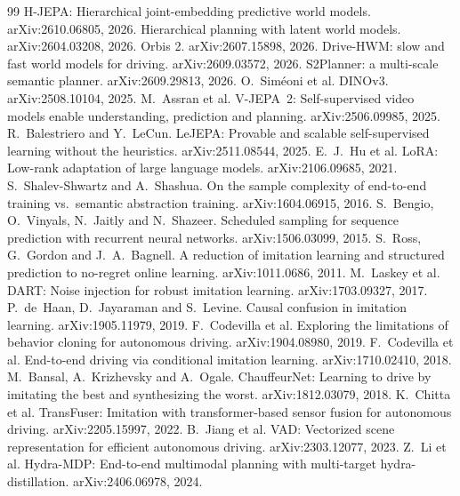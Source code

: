 \documentclass[10pt,twocolumn]{article}
\theoremstyle{remark}
\begin{document}
\begin{thebibliography}{99}\scriptsize\setlength{\itemsep}{0.5pt}\setlength{\parsep}{0pt}
 H-JEPA: Hierarchical joint-embedding predictive world models. arXiv:2610.06805, 2026.
 Hierarchical planning with latent world models. arXiv:2604.03208, 2026.
 Orbis 2. arXiv:2607.15898, 2026.
 Drive-HWM: slow and fast world models for driving. arXiv:2609.03572, 2026.
 S2Planner: a multi-scale semantic planner. arXiv:2609.29813, 2026.
 O.~Sim\'eoni et al. DINOv3. arXiv:2508.10104, 2025.
 M.~Assran et al. V-JEPA~2: Self-supervised video models enable understanding, prediction and planning. arXiv:2506.09985, 2025.
 R.~Balestriero and Y.~LeCun. LeJEPA: Provable and scalable self-supervised learning without the heuristics. arXiv:2511.08544, 2025.
 E.~J.~Hu et al. LoRA: Low-rank adaptation of large language models. arXiv:2106.09685, 2021.
 S.~Shalev-Shwartz and A.~Shashua. On the sample complexity of end-to-end training vs.\ semantic abstraction training. arXiv:1604.06915, 2016.
 S.~Bengio, O.~Vinyals, N.~Jaitly and N.~Shazeer. Scheduled sampling for sequence prediction with recurrent neural networks. arXiv:1506.03099, 2015.
 S.~Ross, G.~Gordon and J.~A.~Bagnell. A reduction of imitation learning and structured prediction to no-regret online learning. arXiv:1011.0686, 2011.
 M.~Laskey et al. DART: Noise injection for robust imitation learning. arXiv:1703.09327, 2017.
 P.~de~Haan, D.~Jayaraman and S.~Levine. Causal confusion in imitation learning. arXiv:1905.11979, 2019.
 F.~Codevilla et al. Exploring the limitations of behavior cloning for autonomous driving. arXiv:1904.08980, 2019.
 F.~Codevilla et al. End-to-end driving via conditional imitation learning. arXiv:1710.02410, 2018.
 M.~Bansal, A.~Krizhevsky and A.~Ogale. ChauffeurNet: Learning to drive by imitating the best and synthesizing the worst. arXiv:1812.03079, 2018.
 K.~Chitta et al. TransFuser: Imitation with transformer-based sensor fusion for autonomous driving. arXiv:2205.15997, 2022.
 B.~Jiang et al. VAD: Vectorized scene representation for efficient autonomous driving. arXiv:2303.12077, 2023.
 Z.~Li et al. Hydra-MDP: End-to-end multimodal planning with multi-target hydra-distillation. arXiv:2406.06978, 2024.

\end{thebibliography}
\end{document}
